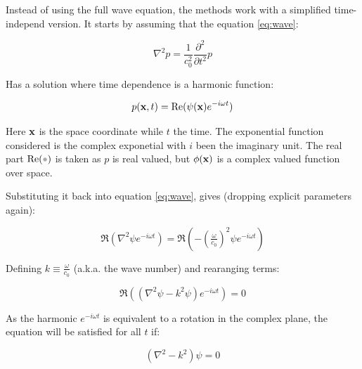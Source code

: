 Instead of using the full wave equation, the methods work with a simplified
time-independ version. It starts by assuming that the equation
\ref{eq:wave}:

\[ \nabla^2 p = \frac{1}{c^2_0}\frac{\partial^2}{\partial t^2} p \]

Has a solution where time dependence is a harmonic function:

\begin{equation}
\label{eq:pressurepsi}
p(\mathrm{\mathbf{x}},t) = \operatorname{Re}(\psi(\mathrm{\mathbf{x}})e^{-i\omega t})
\end{equation}

Here $\mathrm{\mathbf{x}}$ is the space coordinate while $t$ the time. The exponential function
considered is the complex exponetial with $i$ been the imaginary unit. The
real part $\Re(\parm)$ is taken as $p$ is real valued, but $\phi(\mathrm{\mathbf{x}})$ is a
complex valued function over space.

Substituting it back into equation \ref{eq:wave}, gives
(dropping explicit parameters again):

\[ \Re(\nabla^2 \psi e^{-i\omega t}) =
\Re(-(\tfrac{\omega}{c_0})^2 \psi e^{-i\omega t})\]


Defining $k \equiv \tfrac{\omega}{c_0} $ (a.k.a. the wave number) and rearanging
terms:

\[ \Re((\nabla^2 \psi -k^2 \psi) e^{-i\omega t}) = 0\]

As the harmonic $e^{-i\omega t}$ is equivalent to a rotation in the complex
plane, the equation will be satisfied for all $t$ if:

\begin{equation}
\label{eq:helmholtz}
(\nabla^2 -k^2)\psi = 0 
\end{equation}

% 
% 
% 
% 
% 
% 

